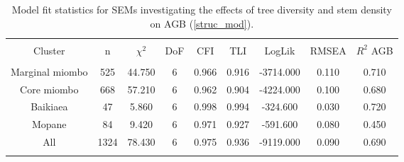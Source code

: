 
\begin{table}[!htbp] \centering 
  \caption{Model fit statistics for SEMs investigating the effects of tree diversity and stem density on AGB (\autoref{struc_mod}).} 
  \label{struc_model_fit_clust_stats} 
\begin{tabular}{@{\extracolsep{0pt}} ccccccccc} 
\\[-1.8ex]\hline 
\hline \\[-1.8ex] 
{Cluster} & {n} & {$\chi^{2}$} & {DoF} & {CFI} & {TLI} & {LogLik} & {RMSEA} & {$R^{2}$ AGB} \\
\hline \\[-1.8ex] 
Marginal miombo & 525 & 44.750 & 6 & 0.966 & 0.916 & -3714.000 & 0.110 & 0.710 \\ 
Core miombo & 668 & 57.210 & 6 & 0.962 & 0.904 & -4224.000 & 0.100 & 0.680 \\ 
Baikiaea & 47 & 5.860 & 6 & 0.998 & 0.994 & -324.600 & 0.030 & 0.720 \\ 
Mopane & 84 & 9.420 & 6 & 0.971 & 0.927 & -591.600 & 0.080 & 0.450 \\ 
All & 1324 & 78.430 & 6 & 0.975 & 0.936 & -9119.000 & 0.090 & 0.690 \\ 
\hline \\[-1.8ex] 
\end{tabular} 
\end{table} 
